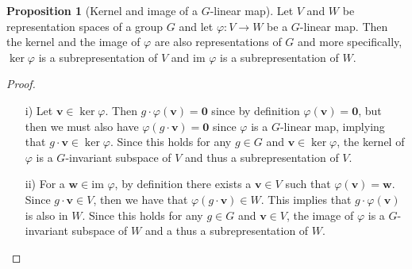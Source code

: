 \documentclass[12pt, a4paper, twoside]{article}
\theoremstyle{definition}
\newtheorem{proposition}[definition]{Proposition}
\theoremstyle{remark}
\numberwithin{equation}{section}
\newcommand{\1}{\mathbf{1}}
\newcommand{\0}{\mathbf{0}}
\newcommand{\im}{\text{im }}
\newcommand{\vvec}{\mathbf{v}}
\newcommand{\wvec}{\mathbf{w}}
\begin{document}
	\begin{proposition}[Kernel and image of a $G$-linear map]\label{prop:kernelimagelinearmap}
		Let $V$ and $W$ be representation spaces of a group $G$ and let $\varphi: V \rightarrow W$ be a $G$-linear map. Then the kernel and the image of $\varphi$ are also representations of $G$ and more specifically, $\ker \varphi$ is a subrepresentation of $V$ and $\im \varphi$ is a subrepresentation of $W$. 
	\end{proposition}
	\begin{proof}
		\begin{itemize}
			\item[i)] Let $\vvec \in \ker \varphi$. Then $g \cdot \varphi (\vvec) = \0$ since by definition $\varphi(\vvec) = \0$, but then we must also have $\varphi ( g \cdot \vvec ) = \0$ since $\varphi$ is a $G$-linear map, implying that $g \cdot \vvec \in \ker \varphi$. Since this holds for any $g \in G$ and $\vvec \in \ker \varphi$, the kernel of $\varphi$ is a $G$-invariant subspace of $V$ and thus a subrepresentation of $V$. %
			\item[ii)] For a $\wvec \in \im \varphi$, by definition there exists a $\vvec \in V$ such that $\varphi(\vvec) = \wvec$. Since $g \cdot \vvec \in V$, then we have that $\varphi ( g \cdot \vvec) \in W$. This implies that $g \cdot \varphi (\vvec)$ is also in $W$. Since this holds for any $g \in G$ and $\vvec \in V$, the image of $\varphi$ is a $G$-invariant subspace of $W$ and a thus a subrepresentation of $W$.	\qedhere
		\end{itemize}
	\end{proof}
	
\end{document}
